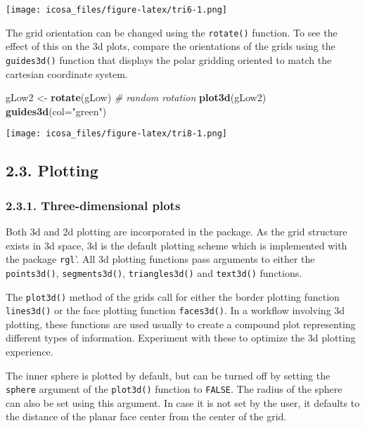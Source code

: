\documentclass[]{article}
\newenvironment{Shaded}{\begin{snugshade}}{\end{snugshade}}
\newcommand{\KeywordTok}[1]{\textcolor[rgb]{0.13,0.29,0.53}{\textbf{#1}}}
\newcommand{\DataTypeTok}[1]{\textcolor[rgb]{0.13,0.29,0.53}{#1}}
\newcommand{\StringTok}[1]{\textcolor[rgb]{0.31,0.60,0.02}{#1}}
\newcommand{\CommentTok}[1]{\textcolor[rgb]{0.56,0.35,0.01}{\textit{#1}}}
\newcommand{\NormalTok}[1]{#1}
\begin{document}
\texttt{[image: icosa\_files/figure-latex/tri6-1.png]}

The grid orientation can be changed using the \texttt{rotate()}
function. To see the effect of this on the 3d plots, compare the
orientations of the grids using the \texttt{guides3d()} function that
displays the polar gridding oriented to match the cartesian coordinate
system.

\begin{Shaded}
\begin{Highlighting}[]
\NormalTok{gLow2 <-}\StringTok{ }\KeywordTok{rotate}\NormalTok{(gLow) }\CommentTok{# random rotation}
\KeywordTok{plot3d}\NormalTok{(gLow2)}
\KeywordTok{guides3d}\NormalTok{(}\DataTypeTok{col=}\StringTok{"green"}\NormalTok{)}
\end{Highlighting}
\end{Shaded}

\texttt{[image: icosa\_files/figure-latex/tri8-1.png]}

\subsection{2.3. Plotting}\label{plotting}

\subsubsection{2.3.1. Three-dimensional
plots}\label{three-dimensional-plots}

Both 3d and 2d plotting are incorporated in the package. As the grid
structure exists in 3d space, 3d is the default plotting scheme which is
implemented with the package \texttt{rgl}'. All 3d plotting functions
pass arguments to either the \texttt{points3d()}, \texttt{segments3d()},
\texttt{triangles3d()} and \texttt{text3d()} functions.

The \texttt{plot3d()} method of the grids call for either the border
plotting function \texttt{lines3d()} or the face plotting function
\texttt{faces3d()}. In a workflow involving 3d plotting, these functions
are used usually to create a compound plot representing different types
of information. Experiment with these to optimize the 3d plotting
experience.

The inner sphere is plotted by default, but can be turned off by setting
the \texttt{sphere} argument of the \texttt{plot3d()} function to
\texttt{FALSE}. The radius of the sphere can also be set using this
argument. In case it is not set by the user, it defaults to the distance
of the planar face center from the center of the grid.
\end{document}
